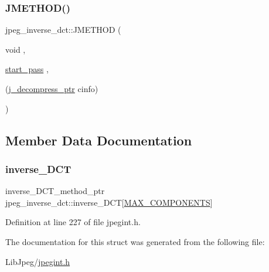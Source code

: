 \subsubsection{\texorpdfstring{JMETHOD()}{JMETHOD()}}
{\footnotesize\ttfamily jpeg\+\_\+inverse\+\_\+dct\+::\+J\+M\+E\+T\+H\+OD (\begin{DoxyParamCaption}\item[{void}]{,  }\item[{\mbox{\hyperlink{jddctmgr_8c_a1964f006adb8fb80f57e455f6452aec1}{start\+\_\+pass}}}]{,  }\item[{(\mbox{\hyperlink{jpeglib_8h_a00c7d78af44bd26a901c791ccfc1e178}{j\+\_\+decompress\+\_\+ptr}} cinfo)}]{ }\end{DoxyParamCaption})}



\subsection{Member Data Documentation}
\mbox{\label{structjpeg__inverse__dct_aa05e35a50f28daf199d2efa702a72c2a}} 
\subsubsection{\texorpdfstring{inverse\_DCT}{inverse\_DCT}}
{\footnotesize\ttfamily inverse\+\_\+\+D\+C\+T\+\_\+method\+\_\+ptr jpeg\+\_\+inverse\+\_\+dct\+::inverse\+\_\+\+D\+CT\mbox{[}\mbox{\hyperlink{jmorecfg_8h_a6d8c910a1fdb6d4762a05f7250e64322}{M\+A\+X\+\_\+\+C\+O\+M\+P\+O\+N\+E\+N\+TS}}\mbox{]}}



Definition at line 227 of file jpegint.\+h.



The documentation for this struct was generated from the following file\+:\begin{DoxyCompactItemize}
\item 
Lib\+Jpeg/\mbox{\hyperlink{jpegint_8h}{jpegint.\+h}}\end{DoxyCompactItemize}
